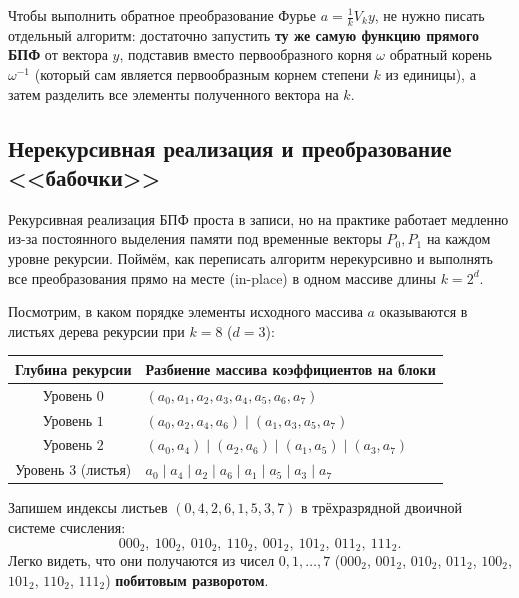 \begin{corollary}
    Чтобы выполнить обратное преобразование Фурье $a = \frac{1}{k} V_k y$, не нужно писать отдельный алгоритм: достаточно запустить \textbf{ту же самую функцию прямого БПФ} от вектора $y$, подставив вместо первообразного корня $\omega$ обратный корень $\omega^{-1}$ (который сам является первообразным корнем степени $k$ из единицы), а затем разделить все элементы полученного вектора на $k$.
\end{corollary}

\subsection{Нерекурсивная реализация и преобразование <<бабочки>>}

Рекурсивная реализация БПФ проста в записи, но на практике работает медленно из-за постоянного выделения памяти под временные векторы $P_0, P_1$ на каждом уровне рекурсии. Поймём, как переписать алгоритм нерекурсивно и выполнять все преобразования прямо на месте (in-place) в одном массиве длины $k = 2^d$.

Посмотрим, в каком порядке элементы исходного массива $a$ оказываются в листьях дерева рекурсии при $k = 8$ ($d = 3$):
\begin{center}
\begin{tabular}{@{}cl@{}}
    \toprule
    \textbf{Глубина рекурсии} & \textbf{Разбиение массива коэффициентов на блоки} \\
    \midrule
    Уровень $0$ & $(a_0, a_1, a_2, a_3, a_4, a_5, a_6, a_7)$ \\
    Уровень $1$ & $(a_0, a_2, a_4, a_6) \;\big|\; (a_1, a_3, a_5, a_7)$ \\
    Уровень $2$ & $(a_0, a_4) \;\big|\; (a_2, a_6) \;\big|\; (a_1, a_5) \;\big|\; (a_3, a_7)$ \\
    Уровень $3$ (листья) & $a_0 \;\big|\; a_4 \;\big|\; a_2 \;\big|\; a_6 \;\big|\; a_1 \;\big|\; a_5 \;\big|\; a_3 \;\big|\; a_7$ \\
    \bottomrule
\end{tabular}
\end{center}

Запишем индексы листьев $(0, 4, 2, 6, 1, 5, 3, 7)$ в трёхразрядной двоичной системе счисления:
\[
    000_2,\ 100_2,\ 010_2,\ 110_2,\ 001_2,\ 101_2,\ 011_2,\ 111_2.
\]
Легко видеть, что они получаются из чисел $0, 1, \dots, 7$ ($000_2$, $001_2$, $010_2$, $011_2$, $100_2$, $101_2$, $110_2$, $111_2$) \textbf{побитовым разворотом}.

